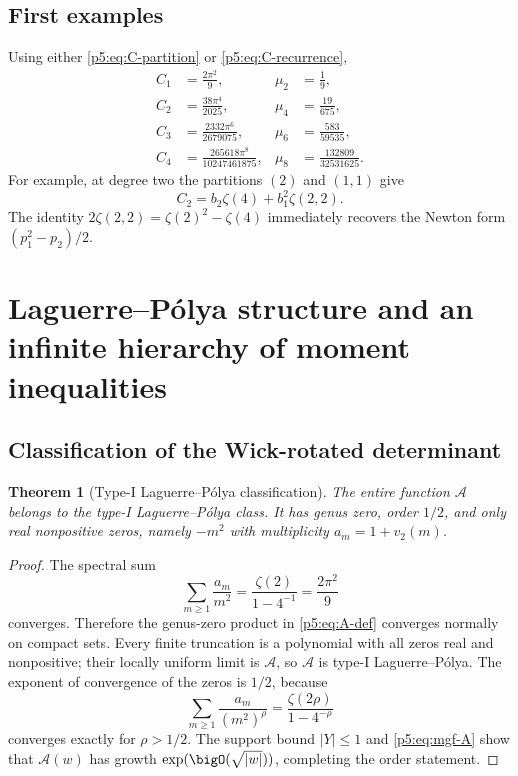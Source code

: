 \documentclass[11pt]{article}
\numberwithin{equation}{section}
\newtheorem{theorem}{Theorem}[section]
\theoremstyle{definition}
\theoremstyle{remark}
\begin{document}
\subsection{First examples}

Using either \cref{p5:eq:C-partition} or \cref{p5:eq:C-recurrence},
\begin{align}
 C_1&=\frac{2\pi^2}{9},
 &\mu_2&=\frac19,\label{p5:eq:first-moments-a}\\
 C_2&=\frac{38\pi^4}{2025},
 &\mu_4&=\frac{19}{675},\\
 C_3&=\frac{2332\pi^6}{2679075},
 &\mu_6&=\frac{583}{59535},\\
 C_4&=\frac{265618\pi^8}{10247461875},
 &\mu_8&=\frac{132809}{32531625}.\label{p5:eq:first-moments-b}
\end{align}
For example, at degree two the partitions $(2)$ and $(1,1)$ give
\begin{equation}\label{p5:eq:C2-MZV}
 C_2=b_2\zeta(4)+b_1^2\zeta(2,2).
\end{equation}
The identity $2\zeta(2,2)=\zeta(2)^2-\zeta(4)$ immediately recovers the
Newton form $(p_1^2-p_2)/2$.

\section{Laguerre--P\'olya structure and an infinite hierarchy of moment inequalities}

\subsection{Classification of the Wick-rotated determinant}

\begin{theorem}[Type-I Laguerre--P\'olya classification]\label{p5:thm:LP}
The entire function $\mathcal A$ belongs to the type-I Laguerre--P\'olya class.
It has genus zero, order $1/2$, and only real nonpositive zeros, namely
$-m^2$ with multiplicity $a_m=1+v_2(m)$.
\end{theorem}

\begin{proof}
The spectral sum
\[
 \sum_{m\ge1}\frac{a_m}{m^2}=\frac{\zeta(2)}{1-4^{-1}}
 =\frac{2\pi^2}{9}
\]
converges.  Therefore the genus-zero product in \cref{p5:eq:A-def} converges
normally on compact sets.  Every finite truncation is a polynomial with all
zeros real and nonpositive; their locally uniform limit is $\mathcal A$, so
$\mathcal A$ is type-I Laguerre--P\'olya.  The exponent of convergence of the
zeros is $1/2$, because
\[
 \sum_{m\ge1}\frac{a_m}{(m^2)^\rho}
 =\frac{\zeta(2\rho)}{1-4^{-\rho}}
\]
converges exactly for $\rho>1/2$.  The support bound $|Y|\le1$ and
\cref{p5:eq:mgf-A} show that $\mathcal A(w)$ has growth
$\exp(\bigO(\sqrt{|w|}))$, completing the order statement.
\end{proof}
\end{document}
